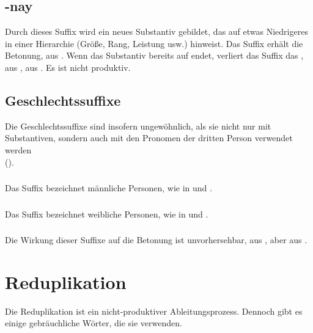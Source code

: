 \subsection{-nay} Durch dieses Suffix wird ein neues Substantiv gebildet, das auf etwas Niedrigeres in einer Hierarchie (Größe, Rang, Leistung usw.) hinweist. Das Suffix erhält die Betonung,   aus  . Wenn das Substantiv bereits auf  endet, verliert das Suffix das ,   aus  ,   aus  . Es ist nicht produktiv.

\subsection{Geschlechtssuffixe} Die Geschlechtssuffixe sind insofern ungewöhnlich, als sie nicht nur mit Substantiven, sondern auch mit den Pronomen der dritten Person verwendet werden\\ ().\label{lingop:suffix:gender}

\subsubsection{} Das Suffix  bezeichnet männliche Personen, wie in   und  .

\subsubsection{} Das Suffix  bezeichnet weibliche Personen, wie in   und  .

\subsubsection{} Die Wirkung dieser Suffixe auf die Betonung ist unvorhersehbar,   aus  , aber   aus  .

\section{Reduplikation}
\noindent Die Reduplikation ist ein nicht-produktiver Ableitungsprozess. Dennoch gibt es einige gebräuchliche Wörter, die sie verwenden. 

